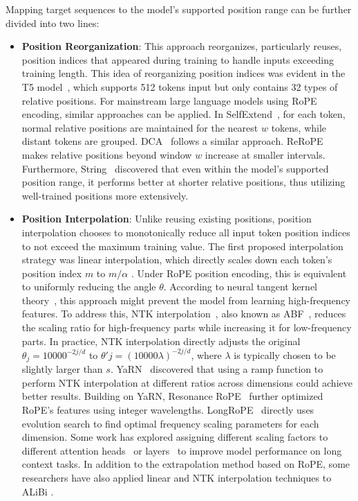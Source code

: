 \documentclass[11pt, a4paper, logo, copyright, nonumbering]{map}
\begin{document}
Mapping target sequences to the model's supported position range can be further divided into two lines:
\begin{itemize}
\item \textbf{Position Reorganization}: This approach reorganizes, particularly reuses, position indices that appeared during training to handle inputs exceeding training length. This idea of reorganizing position indices was evident in the T5 model~\citep{raffel2020exploring}, which supports 512 tokens input but only contains 32 types of relative positions. For mainstream large language models using RoPE encoding, similar approaches can be applied. In SelfExtend~\citep{zhou2023dynaicl}, for each token, normal relative positions are maintained for the nearest $w$ tokens, while distant tokens are grouped. DCA~\citep{an2024training} follows a similar approach. ReRoPE~\citep{kexuefm-9708} makes relative positions beyond window $w$ increase at smaller intervals. Furthermore, String~\citep{an2024does} discovered that even within the model's supported position range, it performs better at shorter relative positions, thus utilizing well-trained positions more extensively.
\item \textbf{Position Interpolation}: Unlike reusing existing positions, position interpolation chooses to monotonically reduce all input token position indices to not exceed the maximum training value. The first proposed interpolation strategy was linear interpolation, which directly scales down each token's position index $m$ to $m/\alpha$ \citep{chen2023extending}. Under RoPE position encoding, this is equivalent to uniformly reducing the angle $\theta$. According to neural tangent kernel theory~\citep{jacot2018neural}, this approach might prevent the model from learning high-frequency features. To address this, NTK interpolation~\citep{peng2023yarn}, also known as ABF~\cite{xiong2023effective}, reduces the scaling ratio for high-frequency parts while increasing it for low-frequency parts. In practice, NTK interpolation directly adjusts the original $\theta_j=10000^{-2j/d}$ to $\theta'j=(10000\lambda)^{-2j/d}$, where $\lambda$ is typically chosen to be slightly larger than $s$. YaRN~\citep{peng2023yarn} discovered that using a ramp function to perform NTK interpolation at different ratios across dimensions could achieve better results. Building on YaRN, Resonance RoPE~\citep{wang2024resonance} further optimized RoPE's features using integer wavelengths. LongRoPE~\citep{ding2024longrope} directly uses evolution search to find optimal frequency scaling parameters for each dimension. Some work has explored assigning different scaling factors to different attention heads~\citep{zhang2024found} or layers~\citep{chen2023fortify} to improve model performance on long context tasks. In addition to the extrapolation method based on RoPE, some researchers have also applied linear and NTK interpolation techniques to ALiBi \citep{al2023position,NtkAlibi2023}.
\end{itemize}
\end{document}
